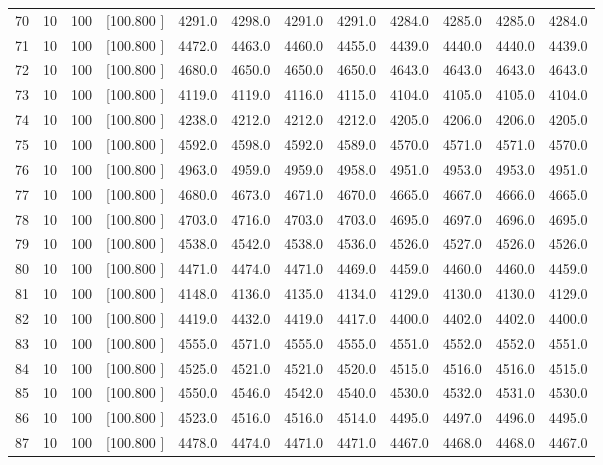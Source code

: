 \documentclass[12pt,a4paper]{article}
\begin{document}
\begin{center}
{\begin{tabular}{r r r r r r r r r r r r}
  70& 10&100&[100.800   ]&  4291.0&  4298.0&  4291.0&  4291.0&  4284.0&  4285.0&  4285.0&  4284.0\\[-0.02in]
  71& 10&100&[100.800   ]&  4472.0&  4463.0&  4460.0&  4455.0&  4439.0&  4440.0&  4440.0&  4439.0\\[-0.02in]
  72& 10&100&[100.800   ]&  4680.0&  4650.0&  4650.0&  4650.0&  4643.0&  4643.0&  4643.0&  4643.0\\[-0.02in]
  73& 10&100&[100.800   ]&  4119.0&  4119.0&  4116.0&  4115.0&  4104.0&  4105.0&  4105.0&  4104.0\\[-0.02in]
  74& 10&100&[100.800   ]&  4238.0&  4212.0&  4212.0&  4212.0&  4205.0&  4206.0&  4206.0&  4205.0\\[-0.02in]
  75& 10&100&[100.800   ]&  4592.0&  4598.0&  4592.0&  4589.0&  4570.0&  4571.0&  4571.0&  4570.0\\[-0.02in]
  76& 10&100&[100.800   ]&  4963.0&  4959.0&  4959.0&  4958.0&  4951.0&  4953.0&  4953.0&  4951.0\\[-0.02in]
  77& 10&100&[100.800   ]&  4680.0&  4673.0&  4671.0&  4670.0&  4665.0&  4667.0&  4666.0&  4665.0\\[-0.02in]
  78& 10&100&[100.800   ]&  4703.0&  4716.0&  4703.0&  4703.0&  4695.0&  4697.0&  4696.0&  4695.0\\[-0.02in]
  79& 10&100&[100.800   ]&  4538.0&  4542.0&  4538.0&  4536.0&  4526.0&  4527.0&  4526.0&  4526.0\\[-0.02in]
  80& 10&100&[100.800   ]&  4471.0&  4474.0&  4471.0&  4469.0&  4459.0&  4460.0&  4460.0&  4459.0\\[-0.02in]
  81& 10&100&[100.800   ]&  4148.0&  4136.0&  4135.0&  4134.0&  4129.0&  4130.0&  4130.0&  4129.0\\[-0.02in]
  82& 10&100&[100.800   ]&  4419.0&  4432.0&  4419.0&  4417.0&  4400.0&  4402.0&  4402.0&  4400.0\\[-0.02in]
  83& 10&100&[100.800   ]&  4555.0&  4571.0&  4555.0&  4555.0&  4551.0&  4552.0&  4552.0&  4551.0\\[-0.02in]
  84& 10&100&[100.800   ]&  4525.0&  4521.0&  4521.0&  4520.0&  4515.0&  4516.0&  4516.0&  4515.0\\[-0.02in]
  85& 10&100&[100.800   ]&  4550.0&  4546.0&  4542.0&  4540.0&  4530.0&  4532.0&  4531.0&  4530.0\\[-0.02in]
  86& 10&100&[100.800   ]&  4523.0&  4516.0&  4516.0&  4514.0&  4495.0&  4497.0&  4496.0&  4495.0\\[-0.02in]
  87& 10&100&[100.800   ]&  4478.0&  4474.0&  4471.0&  4471.0&  4467.0&  4468.0&  4468.0&  4467.0\\[-0.02in]

\end{tabular}}
\end{center}
\end{document}
